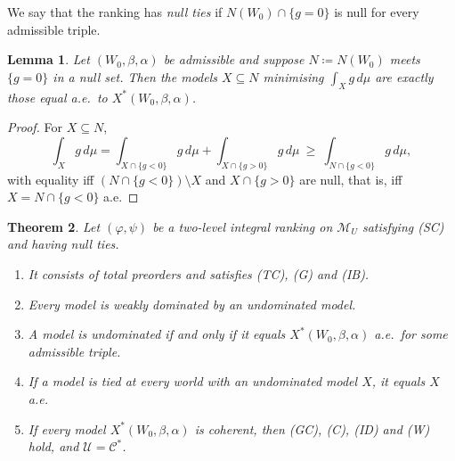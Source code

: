 \documentclass[11pt]{article}
\newcommand{\M}{\mathcal{M}}
\theoremstyle{plain}
\newtheorem{theorem}{Theorem}[section]
\newtheorem{lemma}[theorem]{Lemma}
\theoremstyle{definition}
\theoremstyle{remark}
\begin{document}
We say that the ranking has \emph{null ties} if $N(W_0)\cap\{g=0\}$ is null for every
admissible triple.

\begin{lemma}\label{lem:unique}
Let $(W_0,\beta,\alpha)$ be admissible and suppose $N\coloneqq N(W_0)$ meets $\{g=0\}$ in a
null set. Then the models $X\subseteq N$ minimising $\int_Xg\,d\mu$ are exactly those equal
a.e.\ to $X^\ast(W_0,\beta,\alpha)$.
\end{lemma}

\begin{proof}
For $X\subseteq N$,
\[
  \int_Xg\,d\mu=\int_{X\cap\{g<0\}}g\,d\mu+\int_{X\cap\{g>0\}}g\,d\mu\ \ge\
  \int_{N\cap\{g<0\}}g\,d\mu,
\]
with equality iff $(N\cap\{g<0\})\setminus X$ and $X\cap\{g>0\}$ are null, that is, iff
$X=N\cap\{g<0\}$ a.e.
\end{proof}

\begin{theorem}\label{thm:route}
Let $(\varphi,\psi)$ be a two-level integral ranking on $\M_U$ satisfying (SC) and having
null ties.
\begin{enumerate}[label=(\alph*)]
  \item It consists of total preorders and satisfies (TC), (G) and (IB).
  \item Every model is weakly dominated by an undominated model.
  \item A model is undominated if and only if it equals $X^\ast(W_0,\beta,\alpha)$ a.e.\
  for some admissible triple.
  \item If a model is tied at every world with an undominated model $X$, it equals $X$
  a.e.
  \item If every model $X^\ast(W_0,\beta,\alpha)$ is coherent, then (GC), (C), (ID) and
  (W) hold, and $\mathcal U=\mathcal C^\ast$.
\end{enumerate}
\end{theorem}
\end{document}
